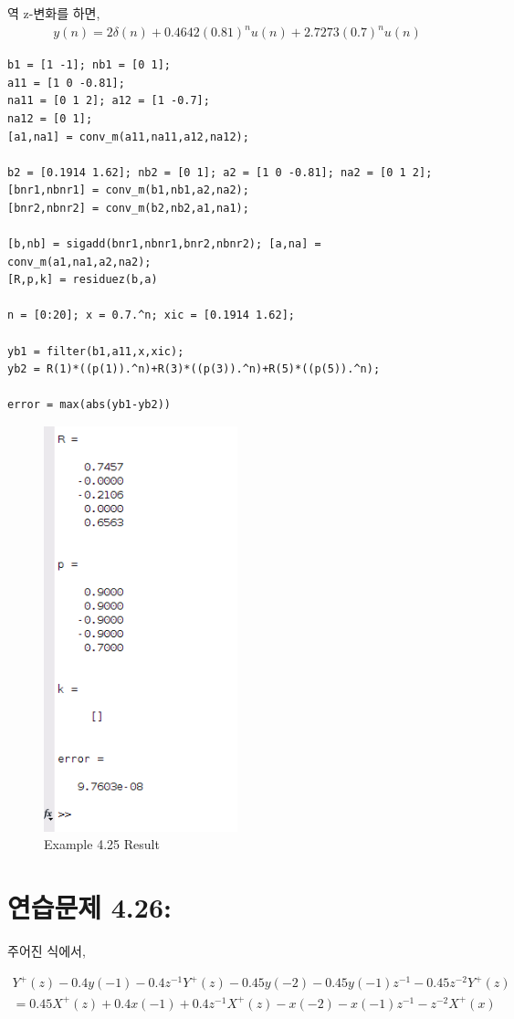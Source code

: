 \documentclass[11pt
  , a4paper
  , article
  , oneside
]{memoir}
\begin{document}
역 z-변화를 하면,
\begin {equation}
\begin {split}
y(n) = 2\delta(n) + 0.4642(0.81)^nu(n)+2.7273(0.7)^nu(n)
\nonumber
\end{split}
\end {equation}

\begin{lstlisting}[style=termstyle]
b1 = [1 -1]; nb1 = [0 1]; 
a11 = [1 0 -0.81]; 
na11 = [0 1 2]; a12 = [1 -0.7];
na12 = [0 1]; 
[a1,na1] = conv_m(a11,na11,a12,na12);

b2 = [0.1914 1.62]; nb2 = [0 1]; a2 = [1 0 -0.81]; na2 = [0 1 2];
[bnr1,nbnr1] = conv_m(b1,nb1,a2,na2); 
[bnr2,nbnr2] = conv_m(b2,nb2,a1,na1);

[b,nb] = sigadd(bnr1,nbnr1,bnr2,nbnr2); [a,na] = conv_m(a1,na1,a2,na2);
[R,p,k] = residuez(b,a)

n = [0:20]; x = 0.7.^n; xic = [0.1914 1.62];

yb1 = filter(b1,a11,x,xic);
yb2 = R(1)*((p(1)).^n)+R(3)*((p(3)).^n)+R(5)*((p(5)).^n);

error = max(abs(yb1-yb2))
\end{lstlisting}


\begin{figure}[h!]
	\centering
	\includegraphics[width=0.5\textwidth,height=0.3\textwidth]{./images/p425.png}
	\caption{Example 4.25 Result}
	\label{fig:Example 4.25 Result}
\end{figure}


\chapter{연습문제 4.26: }
주어진 식에서,

\begin {equation}
\begin {split}
Y^+(z) - 0.4y(-1) -0.4z^{-1}Y^+(z) - 0.45y(-2) - 0.45y(-1)z^{-1} - 0.45z^{-2}Y^+(z) &\\
 = 0.45X^+(z) + 0.4x(-1)+0.4z^{-1}X^+(z)-x(-2)-x(-1)z^{-1}-z^{-2}X^+(x)   \nonumber
\end{split}
\end {equation}
\end{document}
